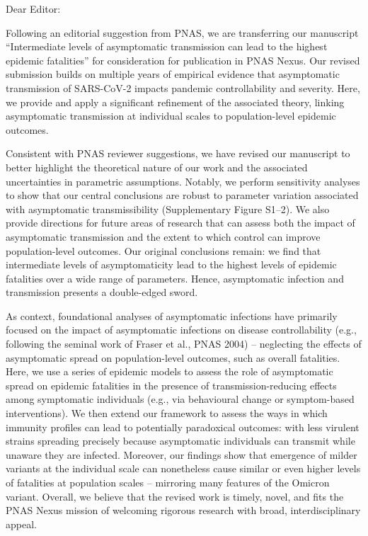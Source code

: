 \documentclass[12pt]{article}
\begin{document}
\noindent Dear Editor:

Following an editorial suggestion from PNAS, we are transferring our manuscript ``Intermediate levels of asymptomatic transmission can lead to the highest epidemic fatalities'' for consideration for publication in PNAS Nexus.
Our revised submission builds on multiple years of empirical evidence that asymptomatic transmission of SARS-CoV-2 impacts pandemic controllability and severity. 
Here, we provide and apply a significant refinement of the associated theory, linking asymptomatic transmission at individual scales to population-level epidemic outcomes.  

Consistent with PNAS reviewer suggestions, we have revised our manuscript to better highlight the theoretical nature of our work and the associated uncertainties in parametric assumptions.  Notably, we perform sensitivity analyses to show that our central conclusions are robust to parameter variation associated with asymptomatic transmissibility (Supplementary Figure S1--2). We also provide directions for future areas of research that can assess both the impact of asymptomatic transmission and the extent to which control can improve population-level outcomes. Our original conclusions remain: we find that intermediate levels of asymptomaticity lead to the highest levels of epidemic fatalities over a wide range of parameters. Hence, asymptomatic infection and transmission presents a double-edged sword. 

As context, foundational analyses of asymptomatic infections have primarily focused on the impact of asymptomatic infections on disease controllability (e.g., following the seminal work of Fraser et al., PNAS 2004) – neglecting the effects of asymptomatic spread on population-level outcomes, such as overall fatalities. Here, we use a series of epidemic models to assess the role of asymptomatic spread on epidemic fatalities in the presence of transmission-reducing effects among symptomatic individuals (e.g., via behavioural change or symptom-based interventions). We then extend our framework to assess the ways in which immunity profiles can lead to potentially paradoxical outcomes: with less virulent strains spreading precisely because asymptomatic individuals can transmit while unaware they are infected.   Moreover, our findings show that emergence of milder variants at the individual scale can nonetheless cause similar or even higher levels of fatalities at population scales – mirroring many features of the Omicron variant. Overall, we believe that the revised work is timely, novel, and fits the PNAS Nexus mission of welcoming rigorous research with broad, interdisciplinary appeal.
\end{document}
